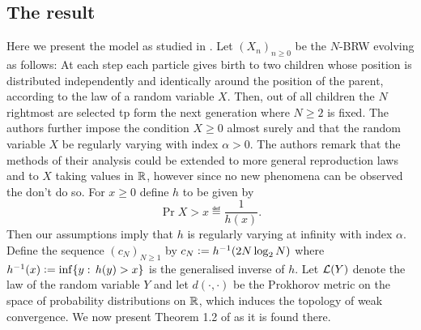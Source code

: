 \subsection{The result}\label{sec:poly_result}
Here we present the model as studied in \cite{poly_tails}. Let $(X_n)_{n \geq 0}$ be the $N$-BRW evolving as follows: At each step each particle gives birth to two children whose position is distributed independently and identically around the position of the parent, according to the law of a random variable $X$. Then, out of all children the $N$ rightmost are selected tp form the next generation where $N \geq 2$ is fixed. The authors further impose the condition $X \geq 0$ almost surely and that the random variable $X$ be regularly varying with index $\alpha > 0$. The authors remark that the methods of their analysis could be extended to more general reproduction laws and to $X$ taking values in $\R$, however since no new phenomena can be observed the don't do so. For $x \geq 0$ define $h$ to be given by
\begin{equation}
\Pr{X > x} \eqdef \frac{1}{h(x)}. 
\end{equation} 
Then our assumptions imply that $h$ is regularly varying at infinity with index $\alpha$. Define the sequence $(c_N)_{N \geq 1}$ by $c_N \defeq h^{-1} (2N \log_2 N)$ where $h^{-1}(x) \defeq \inf\{ y :\, h(y) > x\}$ is the generalised inverse of $h$. Let $\cal{L}(Y)$ denote the law of the random variable $Y$ and let $d(\cdot, \cdot)$ be the Prokhorov metric on the space of probability distributions on $\R$, which induces the topology of weak convergence. We now present Theorem 1.2 of \cite{poly_tails} as it is found there. 

